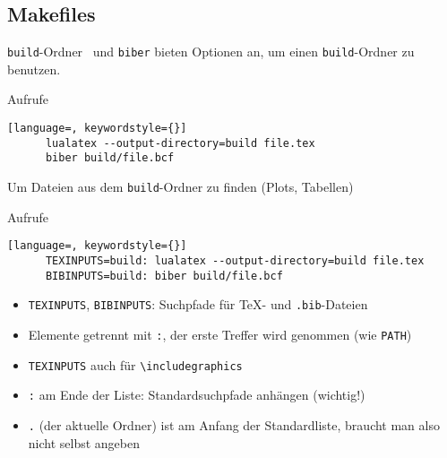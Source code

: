 \subsection{Makefiles}

\begin{frame}[fragile]{\texttt{build}-Ordner}
  \LuaTeX\ und \texttt{biber} bieten Optionen an, um einen \texttt{build}-Ordner zu benutzen.
  \begin{block}{Aufrufe}
    \begin{lstlisting}[language=, keywordstyle={}]
      lualatex --output-directory=build file.tex
      biber build/file.bcf
    \end{lstlisting}
  \end{block}

  Um Dateien aus dem \texttt{build}-Ordner zu finden (Plots, Tabellen)
  \begin{block}{Aufrufe}
    \begin{lstlisting}[language=, keywordstyle={}]
      TEXINPUTS=build: lualatex --output-directory=build file.tex
      BIBINPUTS=build: biber build/file.bcf
    \end{lstlisting}
  \end{block}
  \begin{itemize}
    \item \texttt{TEXINPUTS}, \texttt{BIBINPUTS}: Suchpfade für \TeX- und \texttt{.bib}-Dateien
    \item Elemente getrennt mit \texttt{:}, der erste Treffer wird genommen (wie \texttt{PATH})
    \item \texttt{TEXINPUTS} auch für \lstinline+\includegraphics+
    \item \texttt{:} am Ende der Liste: Standardsuchpfade anhängen (wichtig!)
    \item \texttt{.} (der aktuelle Ordner) ist am Anfang der Standardliste, braucht man also nicht selbst angeben
  \end{itemize}
\end{frame}

